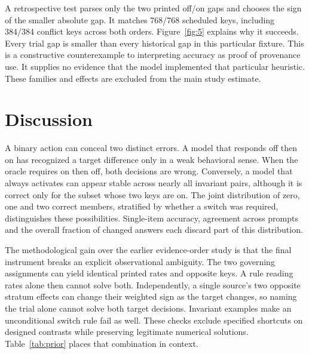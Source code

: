 A retrospective test parses only the two printed off/on gaps and chooses the sign of the smaller absolute gap. It matches 768/768 scheduled keys, including 384/384 conflict keys across both orders. Figure~\ref{fig:5} explains why it succeeds. Every trial gap is smaller than every historical gap in this particular fixture. This is a constructive counterexample to interpreting accuracy as proof of provenance use. It supplies no evidence that the model implemented that particular heuristic. These families and effects are excluded from the main study estimate.

\section{Discussion}
A binary action can conceal two distinct errors. A model that responds off then on has recognized a target difference only in a weak behavioral sense. When the oracle requires on then off, both decisions are wrong. Conversely, a model that always activates can appear stable across nearly all invariant pairs, although it is correct only for the subset whose two keys are on. The joint distribution of zero, one and two correct members, stratified by whether a switch was required, distinguishes these possibilities. Single-item accuracy, agreement across prompts and the overall fraction of changed answers each discard part of this distribution.

The methodological gain over the earlier evidence-order study is that the final instrument breaks an explicit observational ambiguity. The two governing assignments can yield identical printed rates and opposite keys. A rule reading rates alone then cannot solve both. Independently, a single source's two opposite stratum effects can change their weighted sign as the target changes, so naming the trial alone cannot solve both target decisions. Invariant examples make an unconditional switch rule fail as well. These checks exclude specified shortcuts on designed contrasts while preserving legitimate numerical solutions. Table~\ref{tab:prior} places that combination in context.

